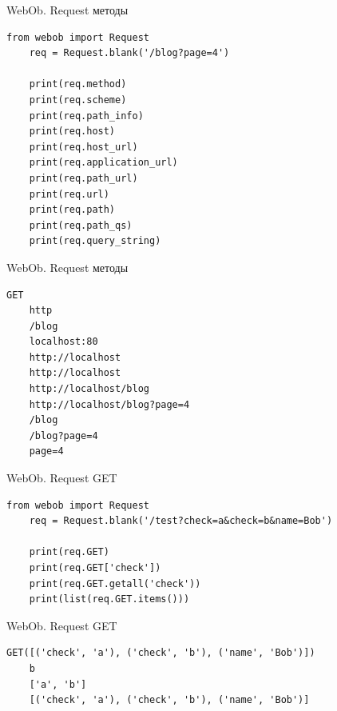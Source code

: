 \begin{frame}[fragile]{WebOb. Request методы}

  \begin{lstlisting}[style=python]
    from webob import Request
    req = Request.blank('/blog?page=4')

    print(req.method)
    print(req.scheme)
    print(req.path_info)
    print(req.host)
    print(req.host_url)
    print(req.application_url)
    print(req.path_url)
    print(req.url)
    print(req.path)
    print(req.path_qs)
    print(req.query_string)
  \end{lstlisting}

\end{frame}


\begin{frame}[fragile]{WebOb. Request методы}

  \begin{lstlisting}[style=python]
    GET
    http
    /blog
    localhost:80
    http://localhost
    http://localhost
    http://localhost/blog
    http://localhost/blog?page=4
    /blog
    /blog?page=4
    page=4
  \end{lstlisting}

\end{frame}

\begin{frame}[fragile]{WebOb. Request GET}

  \begin{lstlisting}[style=python]
    from webob import Request
    req = Request.blank('/test?check=a&check=b&name=Bob')

    print(req.GET)
    print(req.GET['check'])
    print(req.GET.getall('check'))
    print(list(req.GET.items()))
  \end{lstlisting}

\end{frame}

\begin{frame}[fragile]{WebOb. Request GET}

  \begin{lstlisting}[style=python]
    GET([('check', 'a'), ('check', 'b'), ('name', 'Bob')])
    b
    ['a', 'b']
    [('check', 'a'), ('check', 'b'), ('name', 'Bob')]
  \end{lstlisting}

\end{frame}

